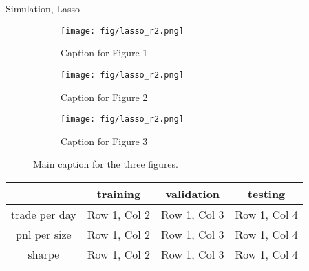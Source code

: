 \documentclass[10pt]{beamer}
\begin{document}
\begin{frame}{Simulation, Lasso}


\begin{figure}[h!]
    \centering
    \begin{subfigure}[b]{0.3\textwidth}
        \centering
        \texttt{[image: fig/lasso\_r2.png]}
        \caption{Caption for Figure 1}
        \label{fig:figure1}
    \end{subfigure}
    \hfill
    \begin{subfigure}[b]{0.3\textwidth}
        \centering
        \texttt{[image: fig/lasso\_r2.png]}
        \caption{Caption for Figure 2}
        \label{fig:figure2}
    \end{subfigure}
    \hfill
    \begin{subfigure}[b]{0.3\textwidth}
        \centering
        \texttt{[image: fig/lasso\_r2.png]}
        \caption{Caption for Figure 3}
        \label{fig:figure3}
    \end{subfigure}
    \caption{Main caption for the three figures.}
    \label{fig:three_figures}
\end{figure}


\begin{table}[h!]
\centering
\begin{tabular}{c|c|c|c}
\hline
 & \textbf{training} & \textbf{validation} & \textbf{testing} \\ \hline
trade per day      & Row 1, Col 2      & Row 1, Col 3      & Row 1, Col 4      \\ \hline
pnl per size      & Row 1, Col 2      & Row 1, Col 3      & Row 1, Col 4      \\ \hline
sharpe      & Row 1, Col 2      & Row 1, Col 3      & Row 1, Col 4      \\ \hline
\end{tabular}
\end{table}


\end{frame}
\end{document}
